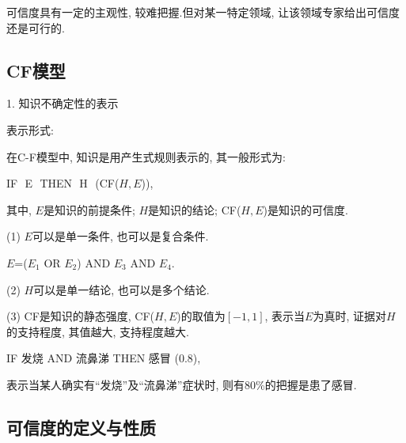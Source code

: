 可信度具有一定的主观性, 较难把握.但对某一特定领域, 让该领域专家给出可信度还是可行的.
\subsection{CF模型}

1. 知识不确定性的表示

表示形式:

在C-F模型中, 知识是用产生式规则表示的, 其一般形式为:
\begin{center}
  IF\,\,   E\,\,    THEN\,\,  H\,\, (CF($H, E$)),
\end{center}
其中, $E$是知识的前提条件; $H$是知识的结论; CF($H, E$)是知识的可信度.
\begin{remark}
(1) $E$可以是单一条件, 也可以是复合条件.
    \begin{example}
        \begin{center}
          $E$=($E_1$  OR  $E_2$)  AND  $E_3$  AND  $E_4$.
        \end{center}
    \end{example}

(2) $H$可以是单一结论, 也可以是多个结论.

(3) CF是知识的静态强度, CF($H, E$)的取值为$[-1, 1]$, 表示当$E$为真时, 证据对$H$的支持程度, 其值越大, 支持程度越大.
\end{remark}

\begin{example}
\begin{center}
      IF   发烧    AND  流鼻涕   THEN   感冒   (0.8),
\end{center}
表示当某人确实有“发烧”及“流鼻涕”症状时, 则有80\%的把握是患了感冒.
\end{example}
\subsection{可信度的定义与性质}
